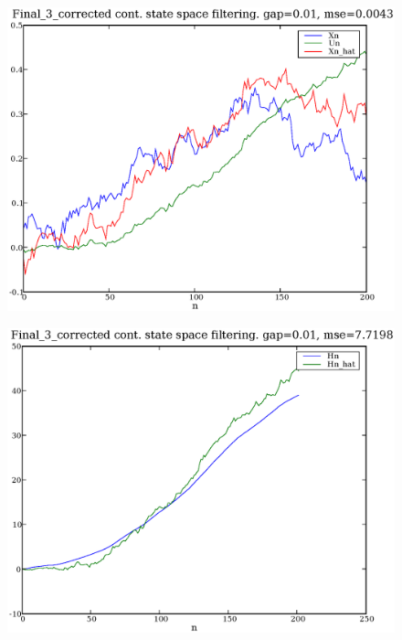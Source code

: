 \documentclass[a4paper,10pt]{article}
\begin{document}
\begin{figure}
\includegraphics[width=1\textwidth]{Final_3_corrected_Xn_Un_Xn_hat_gap_0.01.eps}
\caption{}\label{f5}
\end{figure}

\begin{figure}
\includegraphics[width=1\textwidth]{Final_3_corrected_Hn_Hn_hat_gap_0.01.eps}
\caption{}\label{f6}
\end{figure}
\end{document}
